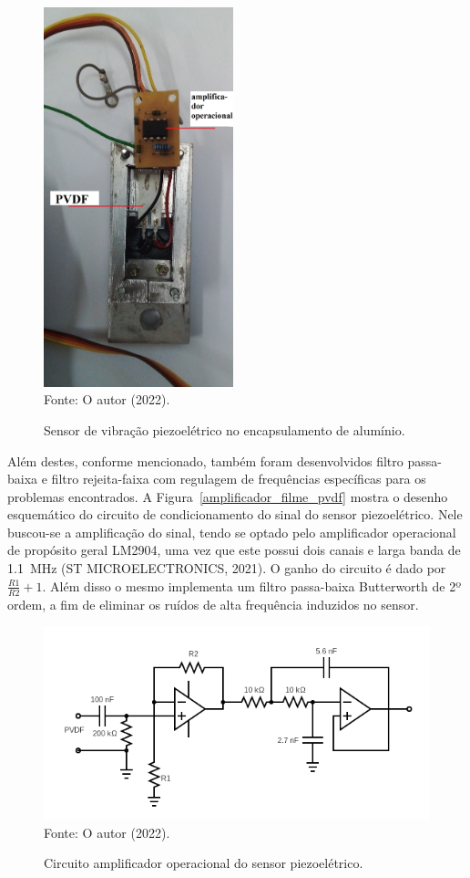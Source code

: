\documentclass[
	12pt,				
	oneside,			
	a4paper,			
	english,			
	brazil,			
	]{abntex2ppgsi}
\begin{document}
\begin{figure}[H]
\centering
\caption {Sensor de vibração piezoelétrico no encapsulamento de alumínio.}
\includegraphics[width=\textwidth,height=110mm,keepaspectratio]{sensor_e_operacional} \\
Fonte: O autor (2022).
\label{sensor_e_operacional}
\end{figure} 

Além destes, conforme mencionado, também foram desenvolvidos filtro passa-baixa e filtro rejeita-faixa com regulagem de frequências específicas para os problemas encontrados. A Figura~\ref{amplificador_filme_pvdf} mostra o desenho esquemático do circuito de condicionamento do sinal do sensor piezoelétrico. Nele buscou-se a amplificação do sinal, tendo se optado pelo amplificador operacional de propósito geral LM2904, uma vez que este possui dois canais e larga banda de \SI{1.1}{\mega\hertz} (ST MICROELECTRONICS, 2021). O ganho do circuito é dado por $ \frac{R1}{R2} + 1$. Além disso o mesmo implementa um filtro passa-baixa Butterworth de 2º ordem, a fim de eliminar os ruídos de alta frequência induzidos no sensor.  

\begin{figure}[H]
\centering
\caption {Circuito amplificador operacional do sensor piezoelétrico.}
\includegraphics[width=\textwidth,height=\textheight,keepaspectratio]{circuito_novo_certo} \\
Fonte: O autor (2022).
\label{circuito_novo}
\end{figure} 
\end{document}

